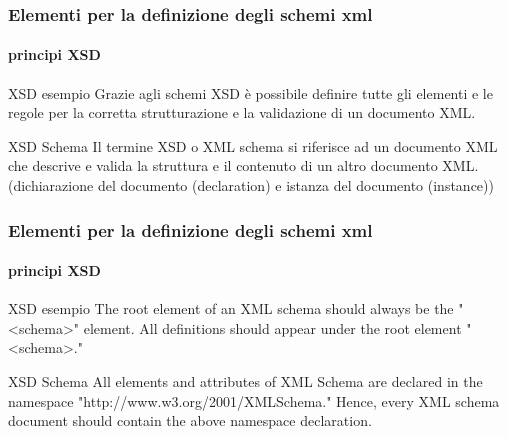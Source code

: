 \begin{frame}
    \frametitle{Elementi per la definizione degli schemi xml}
    \framesubtitle{principi XSD}
    \addtocounter{nframe}{1}

    \begin{block}{XSD esempio}
        Grazie agli schemi XSD è possibile definire tutte gli elementi e le regole per la corretta strutturazione e la validazione di un documento XML.
    \end{block}

    \begin{block}{XSD Schema}
        Il termine XSD o XML schema si riferisce ad un documento XML che descrive e valida la struttura e il contenuto di un altro documento XML.
        (dichiarazione del documento (declaration) e istanza del documento (instance))
    \end{block}
    
\end{frame}


\begin{frame}
    \frametitle{Elementi per la definizione degli schemi xml}
    \framesubtitle{principi XSD}
    \addtocounter{nframe}{1}

    \begin{block}{XSD esempio}
         The root element of an XML schema should always be the "<schema>" element. All definitions should appear under the root element "<schema>."
    \end{block}

    \begin{block}{XSD Schema}
        All elements and attributes of XML Schema are declared in the namespace "http://www.w3.org/2001/XMLSchema." Hence, every XML schema document should contain the above namespace declaration.
    \end{block}
    
\end{frame}


